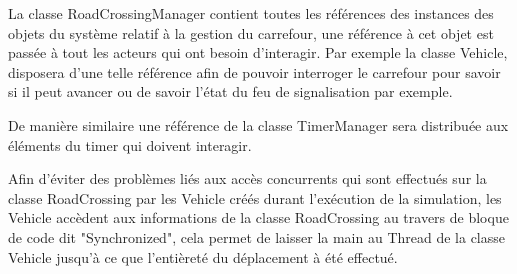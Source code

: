 La classe RoadCrossingManager contient toutes les références des instances des objets du système relatif à la gestion du carrefour, une référence à cet objet est passée à tout les acteurs qui ont besoin d'interagir. Par exemple la classe Vehicle, disposera d'une telle référence afin de pouvoir interroger le carrefour pour savoir si il peut avancer ou de savoir l'état du feu de signalisation par exemple. 

De manière similaire une référence de la classe TimerManager sera distribuée aux éléments du timer qui doivent interagir.

Afin d'éviter des problèmes liés aux accès concurrents qui sont effectués sur la classe RoadCrossing par les Vehicle créés durant l'exécution de la simulation, les Vehicle accèdent aux informations de la classe RoadCrossing au travers de bloque de code dit "Synchronized", cela permet de laisser la main au Thread de la classe Vehicle jusqu'à ce que l'entièreté du déplacement à été effectué.


